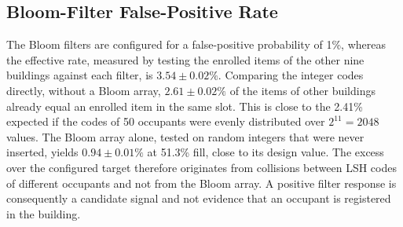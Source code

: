 \documentclass[pdflatex,sn-mathphys-num]{sn-jnl}%
\theoremstyle{thmstyleone}%
\theoremstyle{thmstyletwo}%
\theoremstyle{thmstylethree}%
\begin{document}
\begin{table}[htbp]
\caption{Comparison of verification policies for 10 buildings and a shortlist of five: mean over 20 random building assignments with 95\% confidence half-widths ($\pm$). The adaptive policy uses a score-gap threshold of 5: all five shortlisted buildings are verified when the top two routing scores differ by at most 5, and the sequential rule is used otherwise. A dash indicates that the value is not reported. Contacting every building would require 10 contacts per identification attempt.}
\label{tab:adaptive}
\small
\setlength{\tabcolsep}{3.5pt}
\renewcommand{\arraystretch}{1.25}
\end{table}

\subsection{Bloom-Filter False-Positive Rate}
\label{sec:fpr}

The Bloom filters are configured for a false-positive probability of 1\%, whereas the effective rate, measured by testing the enrolled items of the other nine buildings against each filter, is $3.54 \pm 0.02\%$. Comparing the integer codes directly, without a Bloom array, $2.61 \pm 0.02\%$ of the items of other buildings already equal an enrolled item in the same slot. This is close to the 2.41\% expected if the codes of 50 occupants were evenly distributed over $2^{11}=2048$ values. The Bloom array alone, tested on random integers that were never inserted, yields $0.94 \pm 0.01\%$ at 51.3\% fill, close to its design value. The excess over the configured target therefore originates from collisions between LSH codes of different occupants and not from the Bloom array. A positive filter response is consequently a candidate signal and not evidence that an occupant is registered in the building.
\end{document}
